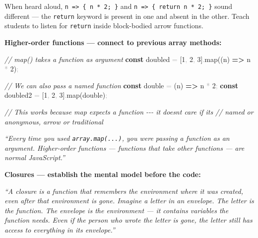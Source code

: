 \documentclass[
  justified,
  openright,
]{tufte-book}
\newcommand{\KeywordTok}[1]{\textcolor{CodeKeyword}{\textbf{#1}}}  %
\newcommand{\CommentTok}[1]{\textcolor{CodeComment}{\textit{#1}}}  %
\newcommand{\CodeNumTok}[1]{\textcolor{CodeNumber}{#1}}             %
\newcommand{\CodeFuncTok}[1]{\textcolor{CodeKeyword}{#1}}           %
\newcommand{\OperatorTok}[1]{\textcolor{DarkGray}{#1}}              %
\newenvironment{Shaded}{%
  \begin{mdframed}[style=TufteCode]%
}{%
  \end{mdframed}%
}
\begin{document}
When heard aloud, \texttt{n\ =\textgreater{}\ \{\ n\ *\ 2;\ \}} and
\texttt{n\ =\textgreater{}\ \{\ return\ n\ *\ 2;\ \}} sound different
--- the \texttt{return} keyword is present in one and absent in the
other. Teach students to listen for \texttt{return} inside block-bodied
arrow functions.

\textbf{Higher-order functions --- connect to previous array methods:}

\begin{Shaded}
\begin{Highlighting}[]
\CommentTok{// map() takes a function as argument}
\KeywordTok{const} doubled \OperatorTok{=} [\CodeNumTok{1}\OperatorTok{,} \CodeNumTok{2}\OperatorTok{,} \CodeNumTok{3}]\OperatorTok{.}\CodeFuncTok{map}((n) \KeywordTok{=\textgreater{}} n \OperatorTok{*} \CodeNumTok{2})\OperatorTok{;}
 
\CommentTok{// We can also pass a named function}
\KeywordTok{const} double \OperatorTok{=} (n) \KeywordTok{=\textgreater{}} n \OperatorTok{*} \CodeNumTok{2}\OperatorTok{;}
\KeywordTok{const} doubled2 \OperatorTok{=} [\CodeNumTok{1}\OperatorTok{,} \CodeNumTok{2}\OperatorTok{,} \CodeNumTok{3}]\OperatorTok{.}\CodeFuncTok{map}(double)\OperatorTok{;}
 
\CommentTok{// This works because map expects a function {-}{-}{-} it doesn\textquotesingle{}t care if it\textquotesingle{}s}
\CommentTok{// named or anonymous, arrow or traditional}
\end{Highlighting}
\end{Shaded}

\emph{``Every time you used \texttt{array.map(...)}, you were passing a
function as an argument. Higher-order functions --- functions that take
other functions --- are normal JavaScript.''}

\textbf{Closures --- establish the mental model before the code:}

\emph{``A closure is a function that remembers the environment where it
was created, even after that environment is gone. Imagine a letter in an
envelope. The letter is the function. The envelope is the environment
--- it contains variables the function needs. Even if the person who
wrote the letter is gone, the letter still has access to everything in
its envelope.''}
\end{document}
